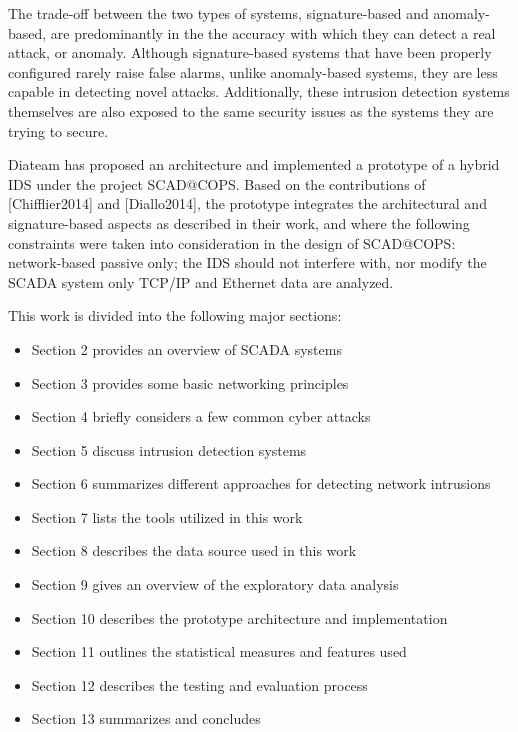 \documentclass[12pt,]{article}
\begin{document}
The trade-off between the two types of systems, signature-based and
anomaly-based, are predominantly in the the accuracy with which they can
detect a real attack, or anomaly. Although signature-based systems that
have been properly configured rarely raise false alarms, unlike
anomaly-based systems, they are less capable in detecting novel attacks.
Additionally, these intrusion detection systems themselves are also
exposed to the same security issues as the systems they are trying to
secure.

Diateam has proposed an architecture and implemented a prototype of a
hybrid IDS under the project SCAD@COPS. Based on the contributions of
{[}Chifflier2014{]} and {[}Diallo2014{]}, the prototype integrates the
architectural and signature-based aspects as described in their work,
and where the following constraints were taken into consideration in the
design of SCAD@COPS: network-based passive only; the IDS should not
interfere with, nor modify the SCADA system only TCP/IP and Ethernet
data are analyzed.

This work is divided into the following major sections:

\begin{itemize}
\itemsep1pt\parskip0pt
\item
  Section 2 provides an overview of SCADA systems
\item
  Section 3 provides some basic networking principles
\item
  Section 4 briefly considers a few common cyber attacks
\item
  Section 5 discuss intrusion detection systems
\item
  Section 6 summarizes different approaches for detecting network
  intrusions
\item
  Section 7 lists the tools utilized in this work
\item
  Section 8 describes the data source used in this work
\item
  Section 9 gives an overview of the exploratory data analysis
\item
  Section 10 describes the prototype architecture and implementation
\item
  Section 11 outlines the statistical measures and features used
\item
  Section 12 describes the testing and evaluation process
\item
  Section 13 summarizes and concludes
\end{itemize}
\end{document}
